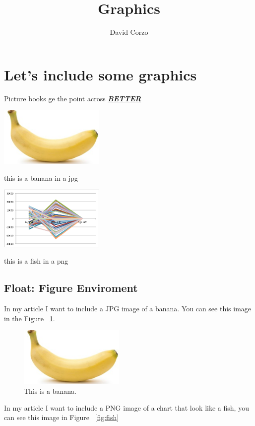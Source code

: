 \documentclass{proc}
\title{Graphics}
\author{David Corzo}
\date{}
\begin{document}
\maketitle


\section{Let's include some graphics}
Picture books ge the point across \underline{\emph{\textbf{BETTER}}}

\smallskip
\includegraphics[width=2in]{Banana.jpg}

this is a banana in a jpg

\includegraphics[width=2in]{fish.png}

this is a fish in a png

\subsection{Float: Figure Enviroment}

In my article I want to include a JPG image of a banana. You can see this image in the Figure ~\ref{fig:banana}.

\begin{figure}[htbp]
\begin{center}
\includegraphics[width=2in]{Banana.jpg}
\caption{This is a banana.}
\label{fig:banana}
\end{center}
\end{figure}

In my article I want to include a PNG image of a chart that look like a fish, you can see this image in Figure ~\ref{fig:fish}
\end{document}
